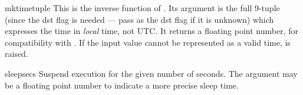 \begin{funcdesc}{mktime}{tuple}
This is the inverse function of .  Its argument is the
full 9-tuple (since the dst flag is needed --- pass  as the
dst flag if it is unknown) which expresses the time
in \emph{local} time, not UTC.  It returns a floating
point number, for compatibility with .  If the input
value cannot be represented as a valid time, 
is raised.
\end{funcdesc}

\begin{funcdesc}{sleep}{secs}
Suspend execution for the given number of seconds.  The argument may
be a floating point number to indicate a more precise sleep time.
\end{funcdesc}

